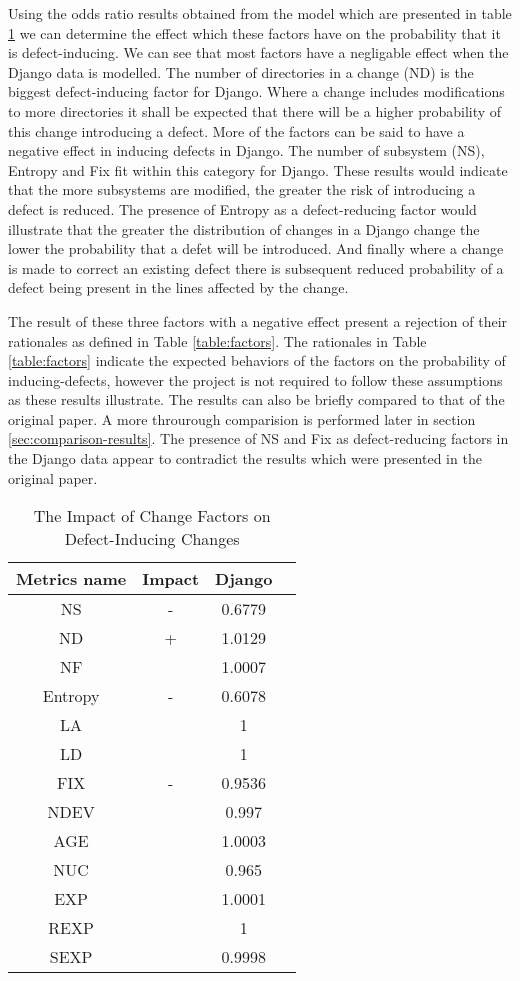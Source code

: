 \documentclass[10pt, conference]{IEEEtran}
\begin{document}
Using the odds ratio results obtained from the model which are presented in table \ref{table:odds_ratio} we can determine the effect which these factors have on the probability that it is defect-inducing.  We can see that most factors have a negligable effect when the Django data is modelled. The number of directories in a change (ND) is the biggest defect-inducing factor for Django. Where a change includes modifications to more directories it shall be expected that there will be a higher probability of this change introducing a defect. More of the factors can be said to have a negative effect in inducing defects in Django. The number of subsystem (NS), Entropy and Fix fit within this category for Django. These results would indicate that the more subsystems are modified, the greater the risk of introducing a defect is reduced. The presence of Entropy as a defect-reducing factor would illustrate that the greater the distribution of changes in a Django change the lower the probability that a defet will be introduced. And finally where a change is made to correct an existing defect there is subsequent reduced probability of a defect being present in the lines affected by the change. 

The result of these three factors with a negative effect present a rejection of their rationales as defined in Table \ref{table:factors}. The rationales in Table \ref{table:factors} indicate the expected behaviors of the factors on the probability of inducing-defects, however the project is not required to follow these assumptions as these results illustrate. The results can also be briefly compared to that of the original paper. A more throurough comparision is performed later in section \ref{sec:comparison-results}.  The presence of NS and Fix as defect-reducing factors in the Django data appear to contradict the results which were presented in the original paper.

\begin{table}
	\centering
	\caption{The Impact of Change Factors on Defect-Inducing Changes}
	\begin{tabular}{|c|c|c|c|}
		\hline Metrics name & Impact & Django \\ 
		\hline NS & - & 0.6779 \\ 
		\hline ND & + & 1.0129 \\ 
		\hline NF &  & 1.0007 \\ 
		\hline Entropy & - & 0.6078 \\ 
		\hline LA &  & 1 \\ 
		\hline LD &  & 1 \\ 
		\hline FIX & - & 0.9536 \\ 
		\hline NDEV &  & 0.997 \\ 
		\hline AGE &  & 1.0003 \\ 
		\hline NUC &  & 0.965 \\ 
		\hline EXP &  & 1.0001 \\ 
		\hline REXP &  & 1 \\ 
		\hline SEXP &  & 0.9998 \\ 
		\hline 
	\end{tabular}
	\label{table:odds_ratio}  
\end{table}
\end{document}
